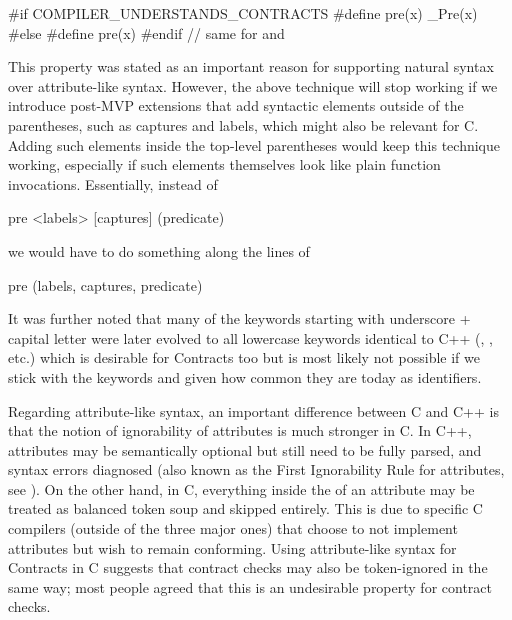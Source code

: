 \begin{codeblock}
#if COMPILER_UNDERSTANDS_CONTRACTS
  #define pre(x) _Pre(x)
#else
  #define pre(x)
#endif
// same for  and 
\end{codeblock}

This property was stated as an important reason for supporting natural syntax over attribute-like syntax. However, the above technique will stop working if we introduce post-MVP extensions that add syntactic elements outside of the parentheses, such as captures and labels,
which might also be relevant for C. Adding such elements inside the top-level parentheses would keep this technique working, especially if such elements themselves look like plain function invocations. Essentially, instead of

\begin{codeblock}
pre <labels> [captures] (predicate)
\end{codeblock}

we would have to do something along the lines of

\begin{codeblock}
pre (labels, captures, predicate)
\end{codeblock}

It was further noted that many of the keywords starting with underscore + capital letter were later evolved to all lowercase keywords identical to C++ (, , etc.) which is desirable for Contracts too but is most likely not possible if we stick with the keywords  and  given how common they are today as identifiers.

Regarding attribute-like syntax, an important difference between C and C++ is that the notion of ignorability of attributes is much stronger in C. In C++, attributes may be semantically optional but still need to be fully parsed, and syntax errors diagnosed (also known as the First Ignorability Rule for attributes, see \cite{P2552R3}). On the other hand, in C, everything inside the \tcode{[[...]]} of an attribute may be treated as balanced token soup and skipped entirely. This is due to specific C compilers (outside of the three major ones) that choose to not implement attributes but wish to remain conforming. Using attribute-like syntax for Contracts in C suggests that contract checks may also be token-ignored in the same way; most people agreed that this is an undesirable property for contract checks.

